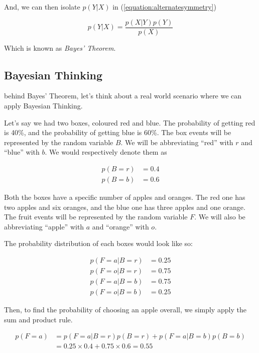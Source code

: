 \documentclass{tufte-handout}
\begin{document}
And, we can then isolate $p(Y|X)$ in (\ref{equation:alternatesymmetry})

\begin{equation}
  p(Y|X) = \frac{p(X|Y)p(Y)}{p(X)}
\end{equation}

Which is known as \emph{Bayes' Theorem}.

\subsection{Bayesian Thinking}

 behind Bayes' Theorem, let's think about a
real world scenario where we can apply Bayesian Thinking.

Let's say we had two boxes, coloured red and blue. The probability of getting
red is 40\%, and the probability of getting blue is 60\%. The box events will
be represented by the random variable $B$. We will be abbreviating ``red'' with
$r$ and ``blue'' with $b$. We would respectively denote them as

\begin{align}
  p(B = r) &= 0.4 \\
  p(B = b) &= 0.6
\end{align}

Both the boxes have a specific number of apples and oranges. The red one has
two apples and six oranges, and the blue one has three apples and one orange.
The fruit events will be represented by the random variable $F$. We will also
be abbreviating ``apple'' with $a$ and ``orange'' with $o$.

The probability distribution of each boxes would look like so:

\begin{align}
  p(F = a | B = r) &= 0.25 \\
  p(F = o | B = r) &= 0.75 \\
  p(F = a | B = b) &= 0.75 \\
  p(F = o | B = b) &= 0.25
\end{align}

Then, to find the probability of choosing an apple overall, we simply apply the
sum and product rule.

\begin{equation}
  \begin{aligned}
    p(F = a) &= p(F = a|B = r)p(B = r) + p(F = a|B = b)p(B = b)\\
             &= 0.25 \times 0.4 + 0.75 \times 0.6 = 0.55
  \end{aligned}
\end{equation}
\end{document}
